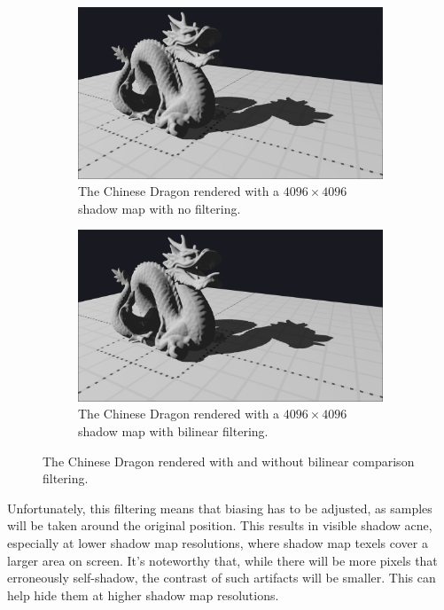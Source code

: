 \begin{figure}[h]
    \begin{subfigure}[t]{0.48\textwidth}
		\centering
        \includegraphics[width=\textwidth]{./graf/tests/basic/cropped/dragon_basic_fhd_4096.png}
        \caption{The Chinese Dragon rendered with a \(4096\times 4096\) shadow map with no filtering.}
    \end{subfigure}
	\hfill
    \begin{subfigure}[t]{0.48\textwidth}
		\centering
        \includegraphics[width=\textwidth]{./graf/tests/bilinear/cropped/dragon_bilinear_fhd_4096.png}
        \caption{The Chinese Dragon rendered with a \(4096\times 4096\) shadow map with bilinear filtering.}
    \end{subfigure}

    \caption{The Chinese Dragon rendered with and without bilinear comparison filtering.}
    \label{fig:test_bilinear_dragon_screens}
\end{figure}

Unfortunately, this filtering means that biasing has to be adjusted, as samples will be taken around the original position. This results in visible shadow acne, especially at lower shadow map resolutions, where shadow map texels cover a larger area on screen. It's noteworthy that, while there will be more pixels that erroneously self-shadow, the contrast of such artifacts will be smaller. This can help hide them at higher shadow map resolutions.

